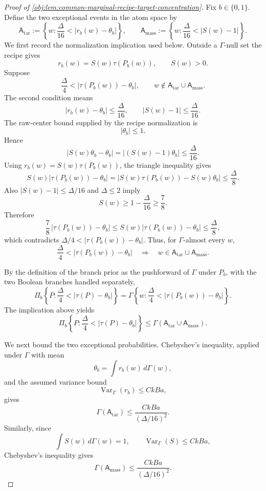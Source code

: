 \documentclass[11pt]{article}
\begin{document}
\begin{proof}[Proof of \cref{obj:lem:common-marginal-recipe-target-concentration}]
Fix \(b\in\{0,1\}\).  Define the two exceptional events in the atom space by
\[
\mathsf A_{\mathrm{tar}}
:=
\left\{w:\frac{\Delta}{16}<|r_b(w)-\theta_b|\right\},
\qquad
\mathsf A_{\mathrm{mass}}
:=
\left\{w:\frac{\Delta}{16}<|S(w)-1|\right\}.
\]
We first record the normalization implication used below.  Outside a \(\Gamma\)-null set the recipe gives
\[
r_b(w)=S(w)\tau(P_b(w)),
\qquad
S(w)>0.
\]
Suppose
\[
\frac{\Delta}{4}<|\tau(P_b(w))-\theta_b|,
\qquad
w\notin \mathsf A_{\mathrm{tar}}\cup\mathsf A_{\mathrm{mass}}.
\]
The second condition means
\[
|r_b(w)-\theta_b|\le \frac{\Delta}{16},
\qquad
|S(w)-1|\le \frac{\Delta}{16}.
\]
The raw-center bound supplied by the recipe normalization is
\[
|\theta_b|\le 1.
\]
Hence
\[
|S(w)\theta_b-\theta_b|
=
|(S(w)-1)\theta_b|
\le \frac{\Delta}{16}.
\]
Using \(r_b(w)=S(w)\tau(P_b(w))\), the triangle inequality gives
\[
S(w)|\tau(P_b(w))-\theta_b|
=
|S(w)\tau(P_b(w))-S(w)\theta_b|
\le
\frac{\Delta}{8}.
\]
Also \(|S(w)-1|\le\Delta/16\) and \(\Delta\le2\) imply
\[
S(w)\ge 1-\frac{\Delta}{16}\ge \frac78 .
\]
Therefore
\[
\frac78\,|\tau(P_b(w))-\theta_b|
\le
S(w)|\tau(P_b(w))-\theta_b|
\le \frac{\Delta}{8},
\]
which contradicts \(\Delta/4<|\tau(P_b(w))-\theta_b|\).  Thus, for \(\Gamma\)-almost every \(w\),
\[
\frac{\Delta}{4}<|\tau(P_b(w))-\theta_b|
\quad\Longrightarrow\quad
w\in\mathsf A_{\mathrm{tar}}\cup\mathsf A_{\mathrm{mass}} .
\]

By the definition of the branch prior as the pushforward of \(\Gamma\) under \(P_b\), with the two Boolean branches handled separately,
\[
\Pi_b\!\left\{P:\frac{\Delta}{4}<|\tau(P)-\theta_b|\right\}
=
\Gamma\!\left\{w:\frac{\Delta}{4}<|\tau(P_b(w))-\theta_b|\right\}.
\]
The implication above yields
\[
\Pi_b\!\left\{P:\frac{\Delta}{4}<|\tau(P)-\theta_b|\right\}
\le
\Gamma(\mathsf A_{\mathrm{tar}}\cup\mathsf A_{\mathrm{mass}}).
\]

We next bound the two exceptional probabilities.  Chebyshev's inequality, applied under \(\Gamma\) with mean
\[
\theta_b=\int r_b(w)\,d\Gamma(w),
\]
and the assumed variance bound
\[
\operatorname{Var}_{\Gamma}(r_b)\le CkBa,
\]
gives
\[
\Gamma(\mathsf A_{\mathrm{tar}})
\le
\frac{CkBa}{(\Delta/16)^2}.
\]
Similarly, since
\[
\int S(w)\,d\Gamma(w)=1,
\qquad
\operatorname{Var}_{\Gamma}(S)\le CkBa,
\]
Chebyshev's inequality gives
\[
\Gamma(\mathsf A_{\mathrm{mass}})
\le
\frac{CkBa}{(\Delta/16)^2}.
\]


\end{proof}
\end{document}
